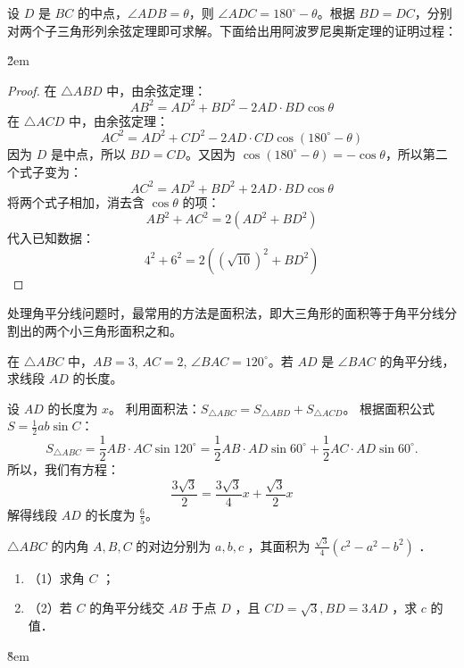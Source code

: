 \begin{solution}
    设 $D$ 是 $BC$ 的中点，$\angle ADB = \theta$，则 $\angle ADC = 180^\circ - \theta$。根据 $ BD = DC$，分别对两个子三角形列余弦定理即可求解。下面给出用阿波罗尼奥斯定理的证明过程：
\end{solution}

\v{2em}

\begin{proof}
    在 $\triangle ABD$ 中，由余弦定理：
    $$
        AB^2 = AD^2 + BD^2 - 2 AD \cdot BD \cos\theta
    $$
    在 $\triangle ACD$ 中，由余弦定理：
    $$
        AC^2 = AD^2 + CD^2 - 2 AD \cdot CD \cos(180^\circ - \theta)
    $$
    因为 $D$ 是中点，所以 $BD=CD$。又因为 $\cos(180^\circ - \theta) = -\cos\theta$，所以第二个式子变为：
    $$
        AC^2 = AD^2 + BD^2 + 2 AD \cdot BD \cos\theta
    $$
    将两个式子相加，消去含 $\cos\theta$ 的项：
    $$
        AB^2 + AC^2 = 2(AD^2 + BD^2)
    $$
    代入已知数据：
    $$
        4^2 + 6^2 = 2((\sqrt{10})^2 + BD^2)
    $$
\end{proof}
\vspace{2em}

\begin{theorem}[角平分线模型]
    处理角平分线问题时，最常用的方法是面积法，即大三角形的面积等于角平分线分割出的两个小三角形面积之和。
\end{theorem}

\begin{example}
    在 $\triangle ABC$ 中，$AB=3$, $AC=2$, $\angle BAC = 120^\circ$。若 $AD$ 是 $\angle BAC$ 的角平分线，求线段 $AD$ 的长度。
\end{example}
\begin{solution}
    设 $AD$ 的长度为 $x$。
    利用面积法：$S_{\triangle ABC} = S_{\triangle ABD} + S_{\triangle ACD}$。
    根据面积公式 $S = \frac{1}{2}ab \sin C$：
    $$
        S_{\triangle ABC} = \frac{1}{2} AB \cdot AC \sin 120^\circ = \frac{1}{2} AB \cdot AD \sin 60^\circ + \frac{1}{2} AC \cdot AD \sin 60^\circ.
    $$
    所以，我们有方程：
    $$
        \frac{3\sqrt{3}}{2} = \frac{3\sqrt{3}}{4}x + \frac{\sqrt{3}}{2}x
    $$
    解得线段 $AD$ 的长度为 $\frac{6}{5}$。
\end{solution}
\vspace{2em}

\begin{problem}
$\triangle A B C$ 的内角 $A, B, C$ 的对边分别为 $a, b, c$ ，其面积为 $\frac{\sqrt{3}}{4}\left(c^2-a^2-b^2\right)$ ．
\begin{enumerate}
    \item （1）求角 $C$ ；
    \item （2）若 $C$ 的角平分线交 $A B$ 于点 $D$ ，且 $C D=\sqrt{3}, B D=3 A D$ ，求 $c$ 的值．
\end{enumerate}
\end{problem}
\v{8em}

